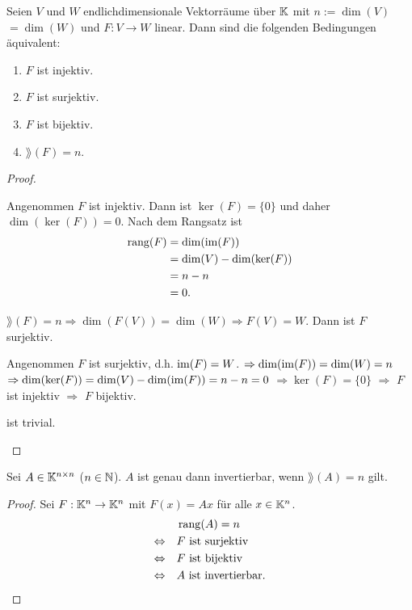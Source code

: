\begin{thm}
	Seien $ V $ und $ W $ endlichdimensionale Vektorräume über $ \mathbb K $ mit $ n := \dim(V) $ $ = \dim(W) $ und $ F : V \to W $ linear. Dann sind die folgenden Bedingungen äquivalent:
	\begin{enumerate}
		\item $ F $ ist injektiv.
		\item $ F $ ist surjektiv.
		\item $ F $ ist bijektiv.
		\item $ \rang(F) = n $.
	\end{enumerate}
\end{thm}
\begin{proof}
\begin{description}[font=\normalfont]
	\item[(i) $ \Rightarrow $ (iv):]
		Angenommen $ F $ ist injektiv. Dann ist $ \ker(F) = \{ 0 \} $ und daher $ \dim(\ker(F)) = 0 $. Nach dem Rangsatz ist
		\begin{align*}
			\operatorname{rang}(F) &= \dim(\operatorname{im}(F))\\
			&= \dim(V) - \dim(\ker(F))\\
			&= n-n\\
			&= 0.
		\end{align*}
	\item[(iv) $ \Rightarrow $ (ii):]
		$ \rang(F) = n \Rightarrow \dim(F(V)) = \dim(W) \Rightarrow F(V) = W $. Dann ist $ F $ surjektiv.
	\item[(ii) $ \Rightarrow $ (iii):]
		Angenommen $ F $ ist surjektiv, d.h. $ \operatorname{im}(F) = W $. $ \Rightarrow \dim(\operatorname{im}(F)) = \dim(W) = n $ $ \Rightarrow \dim(\ker(F)) = \dim(V) - \dim(\operatorname{im}(F)) = n-n=0 $ $ \Rightarrow \ker(F) = \{ 0 \} $ $ \Rightarrow $ $ F $ ist injektiv $ \Rightarrow $ $ F $ bijektiv.
	
	\item[(iii) $ \Rightarrow $ (i)]
		ist trivial. \qedhere
\end{description}
\end{proof}


\begin{klr}
	Sei $ A \in \mathbb K^{n \times n} $ ($ n \in \mathbb N $). $ A $ ist genau dann invertierbar, wenn $ \rang(A) = n $ gilt.
\end{klr}
\begin{proof}
	Sei $ F : \mathbb K^n \to \mathbb K^n $ mit $ F(x) = Ax $ für alle $ x \in \mathbb K^n $.
	\begin{align*}
		&\operatorname{rang}(A) = n\\
		\Leftrightarrow \quad &\text{$ F $ ist surjektiv}\\
		\Leftrightarrow \quad &\text{$ F $ ist bijektiv}\\
		\Leftrightarrow \quad &\text{$ A $ ist invertierbar.} \qedhere
	\end{align*}
\end{proof}


